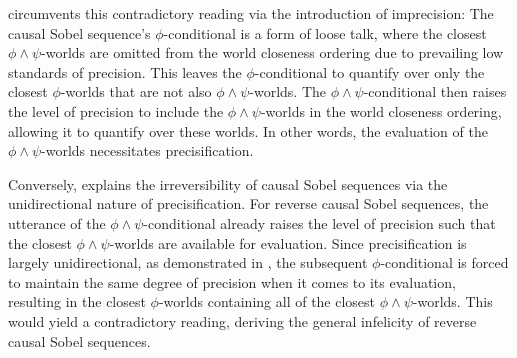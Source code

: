\textcite{Klecha2014} circumvents this contradictory reading via the introduction of imprecision: The causal Sobel sequence's $\phi$-conditional is a form of loose talk, where the closest $\phi\land\psi$-worlds are omitted from the world closeness ordering due to prevailing low standards of precision. This leaves the $\phi$-conditional to quantify over only the closest $\phi$-worlds that are not also $\phi\land\psi$-worlds. The $\phi\land\psi$-conditional then raises the level of precision to include the $\phi\land\psi$-worlds in the world closeness ordering, allowing it to quantify over these worlds. In other words, the evaluation of the $\phi\land\psi$-worlds necessitates precisification.

Conversely, \textcite{Klecha2014} explains the irreversibility of causal Sobel sequences via the unidirectional nature of precisification. For reverse causal Sobel sequences, the utterance of the $\phi\land\psi$-conditional already raises the level of precision such that the closest $\phi\land\psi$-worlds are available for evaluation. Since precisification is largely unidirectional, as demonstrated in , the subsequent $\phi$-conditional is forced to maintain the same degree of precision when it comes to its evaluation, resulting in the closest $\phi$-worlds containing all of the closest $\phi\land\psi$-worlds. This would yield a contradictory reading, deriving the general infelicity of reverse causal Sobel sequences.

